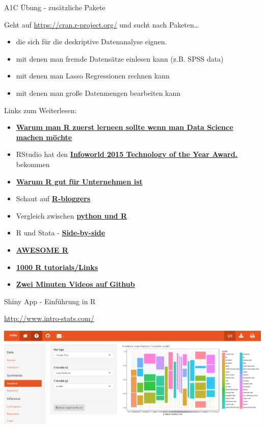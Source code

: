 \documentclass[ignorenonframetext,]{beamer}
\providecommand{\tightlist}{%
  \setlength{\itemsep}{0pt}\setlength{\parskip}{0pt}}
\begin{document}
\begin{frame}{A1C Übung - zusätzliche Pakete}

Geht auf \url{https://cran.r-project.org/} und sucht nach
Paketen\ldots{}

\begin{itemize}
\tightlist
\item
  die sich für die deskriptive Datenanalyse eignen.
\item
  mit denen man fremde Datensätze einlesen kann (z.B. SPSS data)
\item
  mit denen man Lasso Regressionen rechnen kann
\item
  mit denen man große Datenmengen bearbeiten kann
\end{itemize}

\end{frame}

\begin{frame}{Links zum Weiterlesen:}

\begin{itemize}
\item
  \href{http://www.r-bloggers.com/why-you-should-learn-r-first-for-data-science/}{\textbf{Warum
  man R zuerst lerneen sollte wenn man Data Science machen möchte}}
\item
  RStudio hat den
  \href{http://www.r-bloggers.com/rstudio-infoworld-2015-technology-of-the-year-award-recipient/}{\textbf{Infoworld
  2015 Technology of the Year Award.}} bekommen
\item
  \href{http://www.fastcolabs.com/3030063/why\%20the\%20r\%20programming\%20language\%20is\%20good\%20for\%20business}{\textbf{Warum
  R gut für Unternehmen ist}}
\item
  Schaut auf
  \href{http://www.r-bloggers.com/why-use-r/}{\textbf{R-bloggers}} 
\item
  Vergleich zwischen
  \href{http://www.dataschool.io/python-or-r-for-data-science/}{\textbf{python
  und R}}
\item
  R und Stata -
  \href{http://economistry.com/2013/11/r-impact-evaluation-r-stata-side-side/}{\textbf{Side-by-side}}
\item
  \href{https://awesome-r.com/}{\textbf{AWESOME R}}
\item
  \href{https://support.bioconductor.org/p/33781/}{\textbf{1000 R
  tutorials/Links}}
\item
  \href{https://www.youtube.com/playlist?list=PLcgz5kNZFCkzSyBG3H-rUaPHoBXgijHfC}{\textbf{Zwei
  Minuten Videos auf Github}}
\end{itemize}

\end{frame}

\begin{frame}{Shiny App - Einführung in R}

\url{http://www.intro-stats.com/}

\includegraphics{figure/intror_shiny.PNG}

\end{frame}
\end{document}
